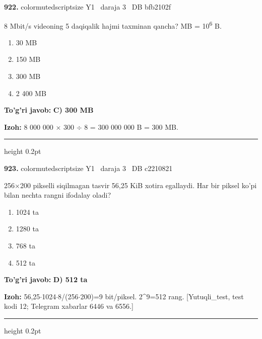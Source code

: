 \documentclass[10pt,a4paper,oneside]{article}
\begin{document}
\noindent\textbf{\color{ink}922.}  {color{muted}scriptsize Y1 \textbullet\ daraja 3 \textbullet\ DB bfb2102f}
\par
8 Mbit/s videoning 5 daqiqalik hajmi taxminan qancha? MB = 10\textsuperscript{6} B.
\begin{enumerate}[label=\Alph*),leftmargin=9mm]
\item 30 MB
\item 150 MB
\item 300 MB
\item 2 400 MB
\end{enumerate}
\begin{tcolorbox}[enhanced,breakable,colback=teal!4,colframe=teal!50!black,boxrule=0.5pt,arc=1.1mm,left=3mm,right=3mm,top=1.7mm,bottom=1.7mm,before skip=2mm,after skip=2mm]
\textbf{\color{teal}To'g'ri javob:} \textbf{C) 300 MB}
\par\smallskip
\textbf{Izoh:} 8 000 000 \ensuremath{\times} 300 \ensuremath{\div} 8 = 300 000 000 B = 300 MB.
\end{tcolorbox}
\vspace{2mm}\hrule height 0.2pt \vspace{3mm}

\noindent\textbf{\color{ink}923.}  {color{muted}scriptsize Y1 \textbullet\ daraja 3 \textbullet\ DB c2210821}
\par
256\ensuremath{\times}200 pikselli siqilmagan tasvir 56,25 KiB xotira egallaydi. Har bir piksel ko'pi bilan nechta rangni ifodalay oladi?
\begin{enumerate}[label=\Alph*),leftmargin=9mm]
\item 1024 ta
\item 1280 ta
\item 768 ta
\item 512 ta
\end{enumerate}
\begin{tcolorbox}[enhanced,breakable,colback=teal!4,colframe=teal!50!black,boxrule=0.5pt,arc=1.1mm,left=3mm,right=3mm,top=1.7mm,bottom=1.7mm,before skip=2mm,after skip=2mm]
\textbf{\color{teal}To'g'ri javob:} \textbf{D) 512 ta}
\par\smallskip
\textbf{Izoh:} 56,25\ensuremath{\cdot}1024\ensuremath{\cdot}8/(256\ensuremath{\cdot}200)=9 bit/piksel. 2\textasciicircum{}9=512 rang. [Yutuqli\_test, test kodi 12; Telegram xabarlar 6446 va 6556.]
\end{tcolorbox}
\vspace{2mm}\hrule height 0.2pt \vspace{3mm}
\end{document}
